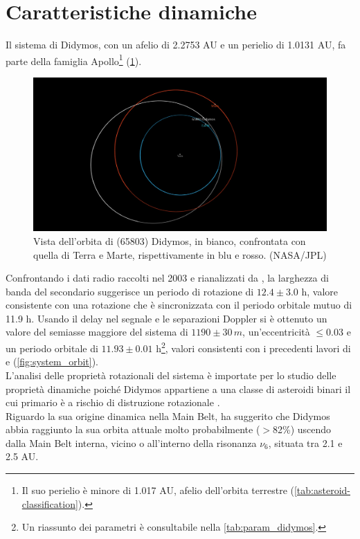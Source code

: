 \documentclass[a4paper,11pt,openright]{book}
\begin{document}
\section{Caratteristiche dinamiche}
Il sistema di Didymos, con un afelio di 2.2753 AU e un perielio di 1.0131 AU, fa parte della famiglia Apollo\footnote{Il suo perielio è minore di 1.017 AU, afelio dell'orbita terrestre (\cref{tab:asteroid-classification}).} (\cref{fig:orbit_view}).

\begin{figure}[!h]
    \centering
    \includegraphics[scale=0.18]{figure/orbit_viewer.jpg}
    \caption[Vista dell'orbita di (65803) Didymos.]{Vista dell'orbita di (65803) Didymos, in bianco, confrontata con quella di Terra e Marte, rispettivamente in blu e rosso. (NASA/JPL)}
    \label{fig:orbit_view}
\end{figure}

Confrontando i dati radio raccolti nel 2003 e rianalizzati da \citet{naidu_radar_2020}, la larghezza di banda del secondario suggerisce un periodo di rotazione di $12.4\pm 3.0$ h, valore consistente con una rotazione che è sincronizzata con il periodo orbitale mutuo di 11.9 h. Usando il delay nel segnale e le separazioni Doppler si è ottenuto un valore del semiasse maggiore del sistema di $1190\pm 30\, m$, un'eccentricità $\leq 0.03$ e un periodo orbitale di $11.93\pm 0.01$ h\footnote{Un riassunto dei parametri è consultabile nella \cref{tab:param_didymos}.}, valori consistenti con i precedenti lavori di \citet{scheirich_modeling_2009} e \citet{fang_near-earth_2012} (\cref{fig:system_orbit}).\\
L'analisi delle proprietà rotazionali del sistema è importate per lo studio delle proprietà dinamiche poiché Didymos appartiene a una classe di asteroidi binari il cui primario è a rischio di distruzione rotazionale \citep{walsh_rotational_2008}.\\
Riguardo la sua origine dinamica nella Main Belt, \citet{richardson_dynamical_2016} ha suggerito che Didymos abbia raggiunto la sua orbita attuale molto probabilmente ($>$82\%) uscendo dalla Main Belt interna, vicino o all'interno della risonanza $\nu_6$, situata tra 2.1 e 2.5 AU.
\end{document}

